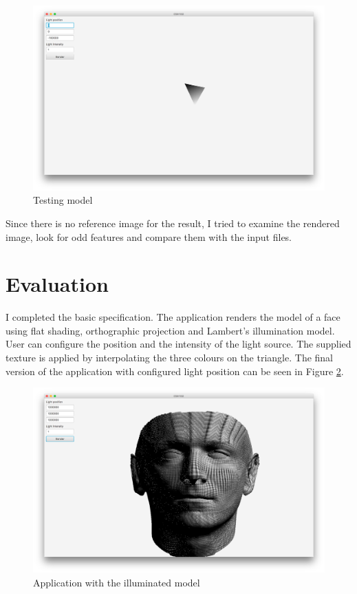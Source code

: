\documentclass[]{article}
\begin{document}
\begin{figure}
  \includegraphics[width=\textwidth]{figures/triangle}
  \caption{Testing model}
  \label{fig:triangle}
\end{figure}

Since there is no reference image for the result, I tried to examine the rendered image, look for odd features and compare them with the input files.

\section{Evaluation}

I completed the basic specification. The application renders the model of a face using flat shading, orthographic projection and Lambert's illumination model. User can configure the position and the intensity of the light source. The supplied texture is applied by interpolating the three colours on the triangle. The final version of the application with configured light position can be seen in Figure \ref{fig:illuminated}.

\begin{figure}
  \includegraphics[width=\textwidth]{figures/illuminated}
  \caption{Application with the illuminated model}
  \label{fig:illuminated}
\end{figure}
\end{document}
